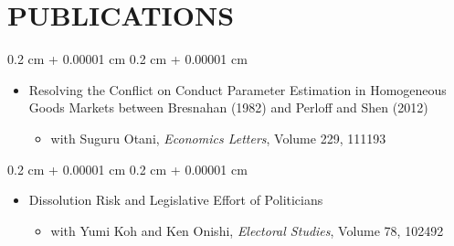 \documentclass[10pt, letterpaper]{article}
\newenvironment{highlights}{
    \begin{itemize}[
        topsep=0.10 cm,
        parsep=0.10 cm,
        partopsep=0pt,
        itemsep=0.0 cm,
        leftmargin=0.4 cm + 10pt
    ]
}{
    \end{itemize}
} %
\newenvironment{onecolentry}{
    \begin{adjustwidth}{
        0.2 cm + 0.00001 cm
    }{
        0.2 cm + 0.00001 cm
    }
}{
    \end{adjustwidth}
} %
\begin{document}
    \section{PUBLICATIONS}
    \begin{samepage}
        \begin{onecolentry}
            \begin{highlights}
                \item Resolving the Conflict on Conduct Parameter Estimation in Homogeneous Goods Markets between Bresnahan (1982) and Perloff and Shen (2012)
                \begin{highlights}
                    \item with Suguru Otani, \textit{Economics Letters}, Volume 229, 111193
                \end{highlights}
            \end{highlights}
        \end{onecolentry}
    \end{samepage}
    \vspace{0.10 cm}
    \begin{samepage}
        \begin{onecolentry}
            \begin{highlights}
                \item Dissolution Risk and Legislative Effort of Politicians
                \begin{highlights}
                    \item with Yumi Koh and Ken Onishi, \textit{Electoral Studies}, Volume 78, 102492
                \end{highlights}
            \end{highlights}
        \end{onecolentry}
    \end{samepage}
\end{document}
